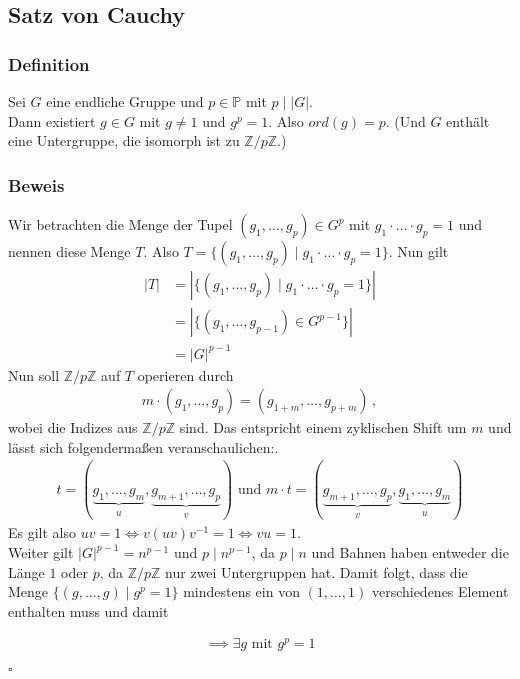 \documentclass[12pt, german]{article}
\newcommand{\Z}{\mathbb{Z}}
\newcommand{\bewiesen}{
	
	\begin{flushright}
		$\square$  \\
\end{flushright}}
\begin{document}
	
	
	\subsection{Satz von Cauchy}		
	\subsubsection{Definition}
	Sei $G$ eine endliche Gruppe und $p \in \mathbb P$ mit $p \mid |G|$. \\
	Dann existiert $g \in G$ mit $g \not = 1$ und $ g^p = 1$. Also $ord(g)= p$. (Und $G$ enthält eine Untergruppe, die isomorph ist zu $\Z/p\Z$.)
	\subsubsection{Beweis}
	Wir betrachten die Menge der Tupel $(g_1,\ldots , g_p) \in G^p$ mit $g_1 \cdot \ldots \cdot g_p = 1$ und nennen diese Menge $T$. Also $T = \{(g_1, \ldots, g_p) \mid  g_1 \cdot \ldots \cdot g_p = 1 \}$. 
	Nun gilt
	\begin{align*}
		|T| &= |\{(g_1, \ldots, g_p) \mid  g_1 \cdot \ldots \cdot g_p = 1 \}| \\
		&= |\{(g_1, \ldots, g_{p-1}) \in G^{p-1} \}| \\
		&= |G|^{p-1}
	\end{align*}
	Nun soll $\mathbb Z /p\mathbb Z$ auf $T$ operieren durch
	\begin{align*}
		m \cdot (g_1,\ldots ,g_p) = (g_{1+m},\ldots ,g_{p+m})\, ,
	\end{align*}
	wobei die Indizes aus $\Z/p\Z$ sind. 
	Das entspricht einem zyklischen Shift um $m$ und lässt sich folgenderma\ss en veranschaulichen:.
	\begin{align*}
		t = (\underbrace{g_1, \ldots, g_m}_{\substack{u}}, \underbrace{g_{m+1}, \ldots, g_p}_{\substack{v}}) \text{ und } m\cdot t = (\underbrace{g_{m+1}, \ldots, g_p}_{\substack{v}}, \underbrace{g_1, \ldots, g_m}_{\substack{u}})
	\end{align*}
	Es gilt also $uv = 1 \iff v(uv)v^{-1} = 1 \iff vu = 1$.\\
	Weiter gilt $|G|^{p-1} = n^{p-1}$ und $p \mid n^{p-1} $, da $p \mid n$
	und Bahnen haben entweder die Länge $1$ oder $p$, da $\mathbb Z /p\mathbb Z$ nur zwei Untergruppen hat. 
	Damit folgt, dass die Menge $\{(g, \ldots, g) \mid g^p= 1 \}$ mindestens ein von $(1,\ldots, 1)$ verschiedenes Element enthalten muss und damit
	
	\begin{align*}
		\implies \exists g \text{ mit } g^p = 1
	\end{align*}
	\bewiesen
	
\end{document}
